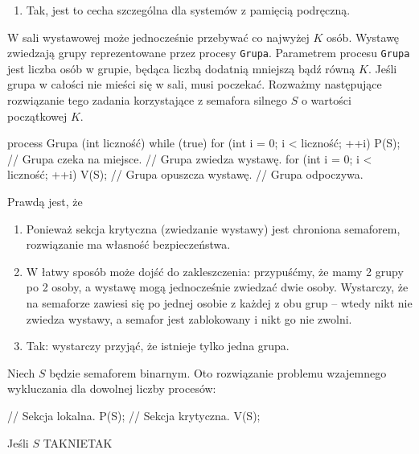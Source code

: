 \begin{solutions}
\begin{enumerate}[\bf A.]
        \item Tak, jest to cecha szczególna dla systemów z pamięcią podręczną.
    \end{enumerate}

    \sol W sali wystawowej może jednocześnie przebywać co najwyżej $K$ osób. Wystawę zwiedzają grupy reprezentowane przez procesy \texttt{Grupa}. Parametrem procesu \texttt{Grupa} jest liczba osób w grupie, będąca liczbą dodatnią mniejszą bądź równą $K$. Jeśli grupa w całości nie mieści się w sali, musi poczekać. Rozważmy następujące rozwiązanie tego zadania korzystające z semafora silnego $S$ o wartości początkowej $K$.
    \begin{java}
        process Grupa (int liczność) {
            while (true) {
                for (int i = 0; i < liczność; ++i) P(S); // Grupa czeka na miejsce.
                // Grupa zwiedza wystawę.
                for (int i = 0; i < liczność; ++i) V(S); // Grupa opuszcza wystawę.
                // Grupa odpoczywa.
            }
        }
    \end{java}
    Prawdą jest, że

    \begin{enumerate}[\bf A.]
        \item Ponieważ sekcja krytyczna (zwiedzanie wystawy) jest chroniona semaforem, rozwiązanie ma własność bezpieczeństwa.

        \item W łatwy sposób może dojść do zakleszczenia: przypuśćmy, że mamy 2 grupy po 2 osoby, a wystawę mogą jednocześnie zwiedzać dwie osoby. Wystarczy, że na semaforze zawiesi się po jednej osobie z każdej z obu grup -- wtedy nikt nie zwiedza wystawy, a semafor jest zablokowany i nikt go nie zwolni.

        \item Tak: wystarczy przyjąć, że istnieje tylko jedna grupa.
    \end{enumerate}

    \sol Niech $S$ będzie semaforem binarnym. Oto rozwiązanie problemu wzajemnego wykluczania dla dowolnej liczby procesów:
    \begin{java}
        // Sekcja lokalna.
        P(S);
        // Sekcja krytyczna.
        V(S);
    \end{java}
    Jeśli $S$
    {TAK}{NIE}{TAK}


\end{solutions}
